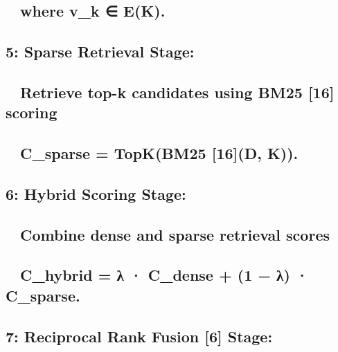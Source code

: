 \subsection*{ where v\_k ∈ E(K).}\label{where-v_k-ek.}

\subsection*{5: Sparse Retrieval Stage:}\label{sparse-retrieval-stage}

\subsection*{ Retrieve top-k candidates using BM25 {[}16{]}
scoring}\label{retrieve-top-k-candidates-using-bm25-16-scoring}

\subsection*{ C\_sparse = TopK(BM25 {[}16{]}(D,
K)).}\label{c_sparse-topkbm25-16d-k.}

\subsection*{6: Hybrid Scoring Stage:}\label{hybrid-scoring-stage}

\subsection*{ Combine dense and sparse retrieval
scores}\label{combine-dense-and-sparse-retrieval-scores}

\subsection*{ C\_hybrid = λ · C\_dense + (1 − λ) ·
C\_sparse.}\label{c_hybrid-ux3bb-c_dense-1-ux3bb-c_sparse.}

\subsection*{7: Reciprocal Rank Fusion {[}6{]}
Stage:}\label{reciprocal-rank-fusion-6-stage}


